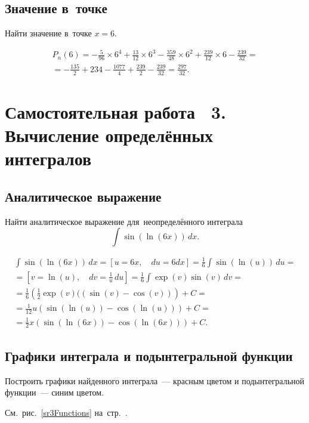 \documentclass[10pt, a4paper, titlepage, oneside]{article}
\begin{document}
\subsection*{Значение в~точке}

Найти значение в~точке $x=6$.

\begin{multline*}
    P_n(6) =
    -\frac{5}{96}\times6^4+\frac{13}{12}\times6^3-\frac{359}{48}\times6^2+\frac{239}{12}\times6-\frac{239}{32}= \\ =
    -\frac{135}{2}+234-\frac{1077}{4}+\frac{239}{2}-\frac{239}{32}=\frac{297}{32}.
\end{multline*}

\clearpage
\section{Самостоятельная работа \textnumero~3. Вычисление определённых интегралов}

\subsection*{Аналитическое выражение}

Найти аналитическое выражение для~неопределённого интеграла $$\int \sin(\ln(6x))\,dx .$$

\begin{multline*}
    \int\sin(\ln(6x))\,dx =
    \left[u=6x, \quad du=6dx\right] =
    \frac{1}{6}\int\sin(\ln(u))\,du = \\ =
    \left[v=\ln(u), \quad dv=\frac{1}{u}\,du\right] =
    \frac{1}{6}\int\exp(v)\sin(v)\,dv = \\ =
    \frac{1}{6}\left(\frac{1}{2}\exp(v)((\sin(v)-\cos(v))\right)+C = \\ =
    \frac{1}{12}u(\sin(\ln(u))-\cos(\ln(u)))+C = \\ =
    \frac{1}{2}x(\sin(\ln(6x))-\cos(\ln(6x)))+C.
\end{multline*}

\subsection*{Графики интеграла и подынтегральной функции}

Построить графики найденного интеграла~--- красным цветом и подынтегральной функции~--- синим цветом.

См.~рис.~\ref{sr3Functions} на~стр.~\pageref{sr3Functions}.
\end{document}
